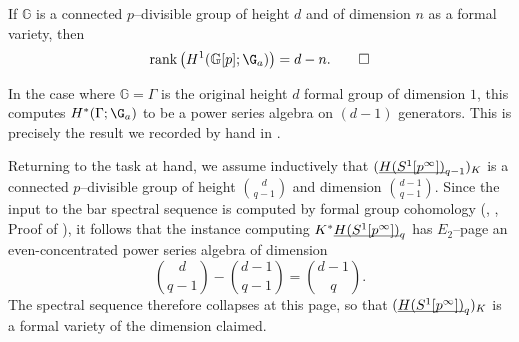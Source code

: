 \begin{lemma}
If $\mathbb G$ is a connected $p$--divisible group of height $d$ and of dimension $n$ as a formal variety, then \[\operatorname{rank}\left(H^1(\mathbb G[p]; \G_a)\right) = d - n. \qed\]
\end{lemma}

\begin{remark}
In the case where $\mathbb G = \Gamma$ is the original height $d$ formal group of dimension $1$, this computes $H^*(\Gamma; \G_a)$ to be a power series algebra on $(d-1)$ generators.  This is precisely the result we recorded by hand in .
\end{remark}

\noindent Returning to the task at hand, we assume inductively that $(\underline{\smash{H(S^1[p^\infty])}}_{q-1})_K$ is a connected $p$--divisible group of height $\binom{d}{q-1}$ and dimension $\binom{d-1}{q-1}$.  Since the input to the bar spectral sequence is computed by formal group cohomology (\cite{LazarevDeformations}, \cite[Example 2.3.5]{HopkinsLurie}, Proof of ), it follows that the instance computing $K^* \underline{\smash{H(S^1[p^\infty])}}_{q}$ has $E_2$--page an even-concentrated power series algebra of dimension \[\binom{d}{q-1} - \binom{d-1}{q-1} = \binom{d-1}{q}.\]  The spectral sequence therefore collapses at this page, so that $(\underline{\smash{H(S^1[p^\infty])}}_{q})_K$ is a formal variety of the dimension claimed.


